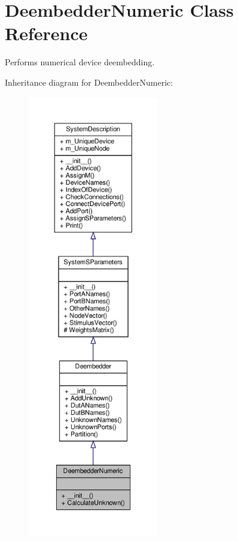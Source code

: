\hypertarget{classSignalIntegrity_1_1SystemDescriptions_1_1DeembedderNumeric_1_1DeembedderNumeric}{}\section{Deembedder\+Numeric Class Reference}
\label{classSignalIntegrity_1_1SystemDescriptions_1_1DeembedderNumeric_1_1DeembedderNumeric}


Performs numerical device deembedding.  




Inheritance diagram for Deembedder\+Numeric\+:
\nopagebreak
\begin{figure}[H]
\begin{center}
\leavevmode
\includegraphics[height=550pt]{classSignalIntegrity_1_1SystemDescriptions_1_1DeembedderNumeric_1_1DeembedderNumeric__inherit__graph}
\end{center}
\end{figure}


